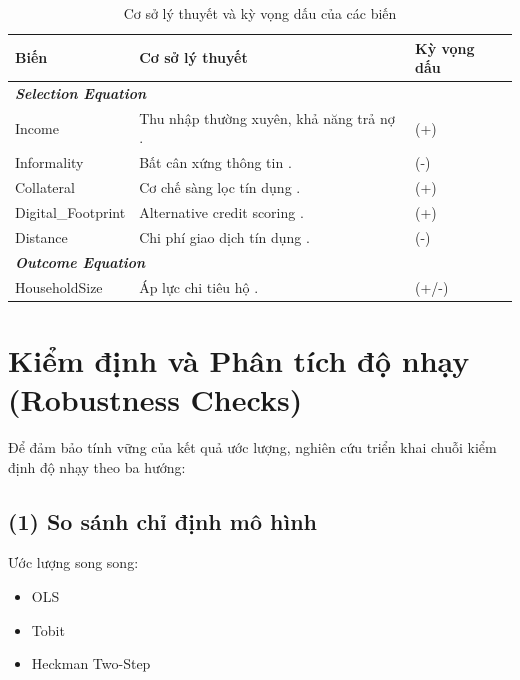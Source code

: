 \documentclass[12pt,a4paper]{report}
\begin{document}
\begin{table}[h]
	\centering
	\small
	\caption{Cơ sở lý thuyết và kỳ vọng dấu của các biến}
	\begin{tabular}{|p{3cm}|p{8.5cm}|p{2.5cm}|}
		\hline
		\textbf{Biến} & \textbf{Cơ sở lý thuyết} & \textbf{Kỳ vọng dấu} \\
		\hline
		\multicolumn{3}{|l|}{\textit{\textbf{Selection Equation}}} \\
		\hline
		Income & Thu nhập thường xuyên, khả năng trả nợ \parencite{Friedman1957}. & (+) \\
		\hline
		Informality & Bất cân xứng thông tin \parencite{Stiglitz1981}. & (-) \\
		\hline
		Collateral & Cơ chế sàng lọc tín dụng \parencite{Besley1994}. & (+) \\
		\hline
		Digital\_Footprint & Alternative credit scoring \parencite{Berg2020}. & (+) \\
		\hline
		Distance & Chi phí giao dịch tín dụng \parencite{Degryse2005}. & (-) \\
		\hline
		\multicolumn{3}{|l|}{\textit{\textbf{Outcome Equation}}} \\
		\hline
		HouseholdSize & Áp lực chi tiêu hộ \parencite{Lipton1980}. & (+/-) \\
		\hline
	\end{tabular}
\end{table}


\section{Kiểm định và Phân tích độ nhạy (Robustness Checks)}

Để đảm bảo tính vững của kết quả ước lượng, nghiên cứu triển khai chuỗi kiểm định độ nhạy theo ba hướng:

\subsection{(1) So sánh chỉ định mô hình}

Ước lượng song song:

\begin{itemize}
	\item OLS
	\item Tobit
	\item Heckman Two-Step
\end{itemize}
\end{document}
